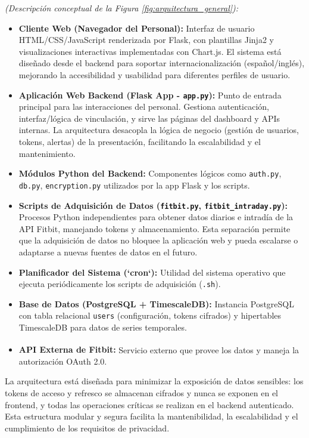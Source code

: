 \textit{(Descripción conceptual de la Figura \ref{fig:arquitectura_general}):}
\begin{itemize}
    \item \textbf{Cliente Web (Navegador del Personal):} Interfaz de usuario HTML/CSS/JavaScript renderizada por Flask, con plantillas Jinja2 y visualizaciones interactivas implementadas con Chart.js. El sistema está diseñado desde el backend para soportar internacionalización (español/inglés), mejorando la accesibilidad y usabilidad para diferentes perfiles de usuario.
    \item \textbf{Aplicación Web Backend (Flask App - \texttt{app.py}):} Punto de entrada principal para las interacciones del personal. Gestiona autenticación, interfaz/lógica de vinculación, y sirve las páginas del dashboard y APIs internas. La arquitectura desacopla la lógica de negocio (gestión de usuarios, tokens, alertas) de la presentación, facilitando la escalabilidad y el mantenimiento.
    \item \textbf{Módulos Python del Backend:} Componentes lógicos como \texttt{auth.py}, \texttt{db.py}, \texttt{encryption.py} utilizados por la app Flask y los scripts.
    \item \textbf{Scripts de Adquisición de Datos (\texttt{fitbit.py}, \texttt{fitbit\_intraday.py}):} Procesos Python independientes para obtener datos diarios e intradía de la API Fitbit, manejando tokens y almacenamiento. Esta separación permite que la adquisición de datos no bloquee la aplicación web y pueda escalarse o adaptarse a nuevas fuentes de datos en el futuro.
    \item \textbf{Planificador del Sistema (`cron`):} Utilidad del sistema operativo que ejecuta periódicamente los scripts de adquisición (\texttt{.sh}).
    \item \textbf{Base de Datos (PostgreSQL + TimescaleDB):} Instancia PostgreSQL con tabla relacional \texttt{users} (configuración, tokens cifrados) y hipertables TimescaleDB para datos de series temporales.
    \item \textbf{API Externa de Fitbit\textsuperscript{\textregistered}:} Servicio externo que provee los datos y maneja la autorización OAuth 2.0.
\end{itemize}   
La arquitectura está diseñada para minimizar la exposición de datos sensibles: los tokens de acceso y refresco se almacenan cifrados y nunca se exponen en el frontend, y todas las operaciones críticas se realizan en el backend autenticado. Esta estructura modular y segura facilita la mantenibilidad, la escalabilidad y el cumplimiento de los requisitos de privacidad.

